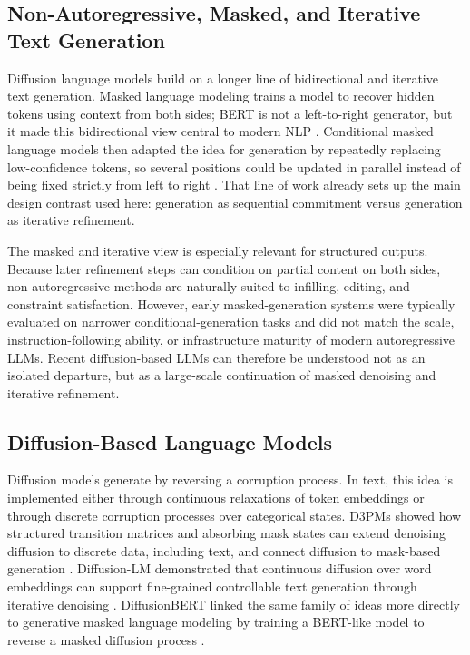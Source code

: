 \subsection{Non-Autoregressive, Masked, and Iterative Text Generation}
Diffusion language models build on a longer line of bidirectional and
iterative text generation. Masked language modeling trains a model to recover
hidden tokens using context from both sides; BERT is not a left-to-right
generator, but it made this bidirectional view central to modern NLP
\cite{devlin2019bert}. Conditional masked language models then adapted the idea
for generation by repeatedly replacing low-confidence tokens, so several
positions could be updated in parallel instead of being fixed strictly from
left to right \cite{ghazvininejad2019maskpredict}. That line of work already
sets up the main design contrast used here: generation as sequential commitment
versus generation as iterative refinement.

The masked and iterative view is especially relevant for structured outputs. Because later refinement steps can condition on partial content on both sides, non-autoregressive methods are naturally suited to infilling, editing, and constraint satisfaction. However, early masked-generation systems were typically evaluated on narrower conditional-generation tasks and did not match the scale, instruction-following ability, or infrastructure maturity of modern autoregressive LLMs. Recent diffusion-based LLMs can therefore be understood not as an isolated departure, but as a large-scale continuation of masked denoising and iterative refinement.

\subsection{Diffusion-Based Language Models}
Diffusion models generate by reversing a corruption process. In text, this idea is implemented either through continuous relaxations of token embeddings or through discrete corruption processes over categorical states. D3PMs showed how structured transition matrices and absorbing mask states can extend denoising diffusion to discrete data, including text, and connect diffusion to mask-based generation \cite{austin2021structured}. Diffusion-LM demonstrated that continuous diffusion over word embeddings can support fine-grained controllable text generation through iterative denoising \cite{li2022diffusionlm}. DiffusionBERT linked the same family of ideas more directly to generative masked language modeling by training a BERT-like model to reverse a masked diffusion process \cite{he2023diffusionbert}.

